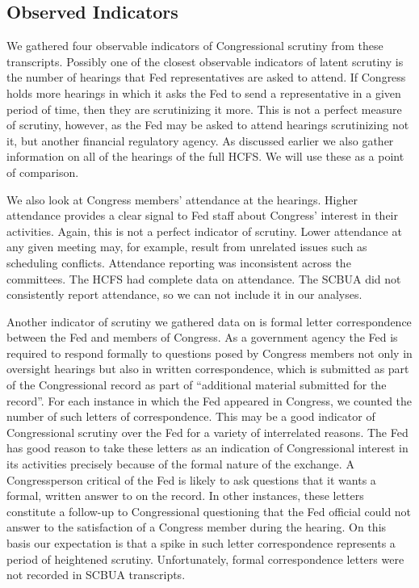 \documentclass[a4paper]{article}\usepackage[]{graphicx}\usepackage[]{color}
\begin{document}
\subsection{Observed Indicators}

We gathered four observable indicators of Congressional scrutiny from these transcripts. Possibly one of the closest observable indicators of latent scrutiny is the number of hearings that Fed representatives are asked to attend. If Congress holds more hearings in which it asks the Fed to send a representative in a given period of time, then they are scrutinizing it more. This is not a perfect measure of scrutiny, however, as the Fed may be asked to attend hearings scrutinizing not it, but another financial regulatory agency. As discussed earlier we also gather information on all of the hearings of the full HCFS. We will use these as a point of comparison.

We also look at Congress members' attendance at the hearings. Higher attendance provides a clear signal to Fed staff about Congress' interest in their activities. Again, this is not a perfect indicator of scrutiny. Lower attendance at any given meeting may, for example, result from unrelated issues such as scheduling conflicts. Attendance reporting was inconsistent across the committees. The HCFS had complete data on attendance. The SCBUA did not consistently report attendance, so we can not include it in our analyses.

Another indicator of scrutiny we gathered data on is formal letter correspondence between the Fed and members of Congress. As a government agency the Fed is required to respond formally to questions posed by Congress members not only in oversight hearings but also in written correspondence, which is submitted as part of the Congressional record as part of ``additional material submitted for the record''. For each instance in which the Fed appeared in Congress, we counted the number of such letters of correspondence. This may be a good indicator of Congressional scrutiny over the Fed for a variety of interrelated reasons. The Fed has good reason to take these letters as an indication of Congressional interest in its activities precisely because of the formal nature of the exchange. A Congressperson critical of the Fed is likely to ask questions that it wants a formal, written answer to on the record. In other instances, these letters constitute a follow-up to Congressional questioning that the Fed official could not answer to the satisfaction of a Congress member during the hearing. On this basis our expectation is that a spike in such letter correspondence represents a period of heightened scrutiny. Unfortunately, formal correspondence letters were not recorded in SCBUA transcripts.
\end{document}
